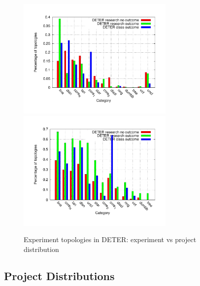 \begin{figure}[htbp] \begin{center} \includegraphics[width=3in,
type=pdf,ext=.pdf,read=.pdf]{figs/topo.gnu} \includegraphics[width=3in,
type=pdf,ext=.pdf,read=.pdf]{figs/topop.gnu} \caption{Experiment
topologies in DETER: experiment vs project distribution} \label{topo}
\end{center} \end{figure}



\subsection{Project Distributions} 

